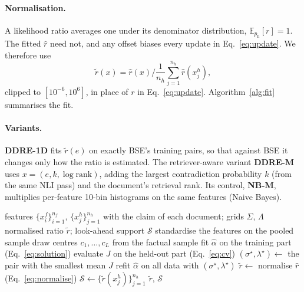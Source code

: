 \documentclass[11pt]{article}
\newcommand{\E}{\mathbb{E}}
\newcommand{\ph}{p_{\mathrm{h}}}
\begin{document}
\paragraph{Normalisation.} A likelihood ratio averages one under its
denominator distribution, $\E_{\ph}[r] = 1$. The fitted $\hat r$ need not, and
any offset biases every update in Eq.~\ref{eq:update}. We therefore use
\begin{equation}
\tilde r(x) = \hat r(x) \Big/ \frac{1}{n_h}\sum_{j=1}^{n_h} \hat r(x^h_j),
\label{eq:normalise}
\end{equation}
clipped to $[10^{-6}, 10^{6}]$, in place of $r$ in Eq.~\ref{eq:update}.
Algorithm~\ref{alg:fit} summarises the fit.

\paragraph{Variants.} \textbf{DDRE-1D} fits $\tilde r(e)$ on exactly BSE's
training pairs, so that against BSE it changes only how the ratio is
estimated. The retriever-aware variant \textbf{DDRE-M} uses
$x = (e, k, \log \mathrm{rank})$, adding the largest contradiction probability
$k$ (from the same NLI pass) and the document's retrieval rank. Its control,
\textbf{NB-M}, multiplies per-feature 10-bin histograms on the same features
(Naive Bayes).

\begin{algorithm}[t]
\caption{Fitting the direct ratio}
\label{alg:fit}
\small
\begin{algorithmic}[1]
\Require features $\{x^f_i\}_{i=1}^{n_f}$, $\{x^h_j\}_{j=1}^{n_h}$ with the claim of each document; grids $\Sigma$, $\Lambda$
\Ensure normalised ratio $\tilde r$; look-ahead support $\mathcal{S}$
\State standardise the features on the pooled sample
\State draw centres $c_1, \dots, c_L$ from the factual sample
\For{$(\sigma, \lambda) \in \Sigma \times \Lambda$}
    \State fit $\hat\alpha$ on the training part (Eq.~\ref{eq:solution})
    \State evaluate $J$ on the held-out part (Eq.~\ref{eq:cv})
  \EndFor
\EndFor
\State $(\sigma^\star, \lambda^\star) \gets$ the pair with the smallest mean $J$
\State refit $\hat\alpha$ on all data with $(\sigma^\star, \lambda^\star)$
\State $\tilde r \gets$ normalise $\hat r$ (Eq.~\ref{eq:normalise})
\State $\mathcal{S} \gets \{\tilde r(x^h_j)\}_{j=1}^{n_h}$
\State \Return $\tilde r$, $\mathcal{S}$
\end{algorithmic}
\end{algorithm}
\end{document}
